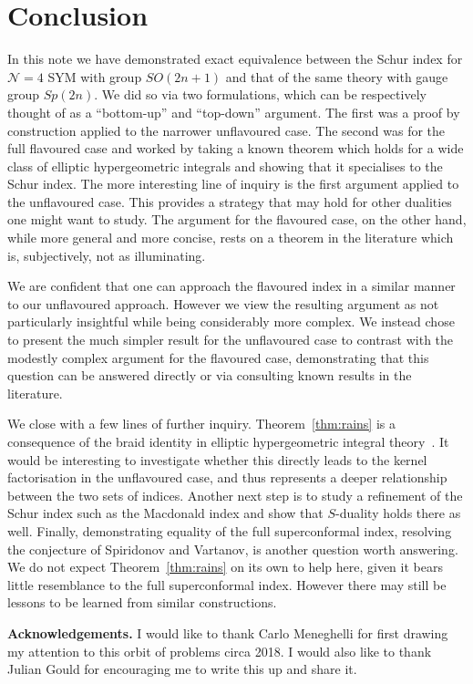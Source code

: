 \section{Conclusion}
\label{sec:conclusion}
In this note we have demonstrated exact equivalence between the Schur index for
$\mathcal{N}=4$ SYM with group $SO(2n+1)$ and that of the same theory with gauge
group $Sp(2n)$. We did so via two formulations, which can be respectively
thought of as a ``bottom-up'' and ``top-down'' argument. The first was a proof
by construction applied to the narrower unflavoured case. The second was for the
full flavoured case and worked by taking a known theorem which holds for a
wide class of elliptic hypergeometric integrals and showing that it specialises
to the Schur index. The more interesting line of inquiry is the first argument
applied to the unflavoured case. This provides a strategy that may hold for
other dualities one might want to study. The argument for the flavoured case, on
the other hand, while more general and more concise, rests on a theorem in the
literature which is, subjectively, not as illuminating.

We are confident that one can approach the flavoured index in a similar manner
to our unflavoured approach. However we view the resulting argument as not
particularly insightful while being considerably more complex. We instead chose
to present the much simpler result for the unflavoured case to contrast with the
modestly complex argument for the flavoured case, demonstrating that this
question can be answered directly or via consulting known results in the
literature.

We close with a few lines of further inquiry. Theorem~\ref{thm:rains} is a
consequence of the braid identity in elliptic hypergeometric integral
theory~\cite{Rains:2018kernel}.
It would be interesting to investigate whether this directly leads to the
kernel factorisation in the unflavoured case, and thus represents a deeper
relationship between the two sets of indices. Another next step is to study a
refinement of the Schur index such as the Macdonald index and show that
$S$-duality holds there as well. Finally, demonstrating equality of the full
superconformal index, resolving the conjecture of
Spiridonov and Vartanov, is another question worth answering. We do not expect
Theorem~\ref{thm:rains} on its own to help here, given it bears little
resemblance to the full superconformal index. However there may still be
lessons to be learned from similar constructions.

\textbf{Acknowledgements.} I would like to thank Carlo Meneghelli for first
drawing my attention to this orbit of problems circa 2018. I would also like to
thank Julian Gould for encouraging me to write this up and share it.
